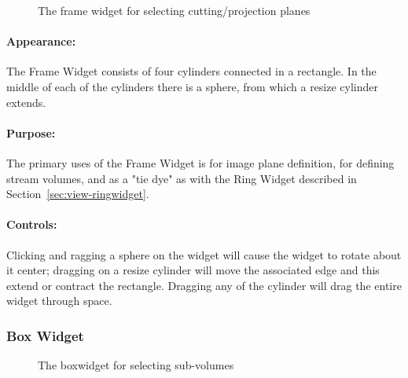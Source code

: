 \begin{figure}[htb]
  \begin{makeimage}
  \end{makeimage}
  \framewidget
  \caption{\label{fig:boxwidget} The frame widget for selecting
    cutting/projection planes}
\end{figure}


\paragraph{Appearance: } The Frame Widget consists of four cylinders
connected in a rectangle.  In the middle of each of the cylinders there is
a sphere, from which a resize cylinder extends.

\paragraph{Purpose:} The primary uses of the Frame Widget is for image
plane definition, for defining stream volumes, and as a "tie dye" as with
the Ring Widget described in Section~\ref{sec:view-ringwidget}.

\paragraph{Controls: } Clicking and ragging a sphere on the widget will
cause the widget to rotate about it center; dragging on a resize cylinder
will move the associated edge and this extend or contract the rectangle.
Dragging any of the cylinder will drag the entire widget through space.


\subsubsection{Box Widget}
\label{sec:view-boxwidget} 

\begin{figure}[htb]
  \begin{makeimage}
  \end{makeimage}
  \boxwidget
  \caption{\label{fig:boxwidget} The boxwidget for selecting sub-volumes}
\end{figure}

